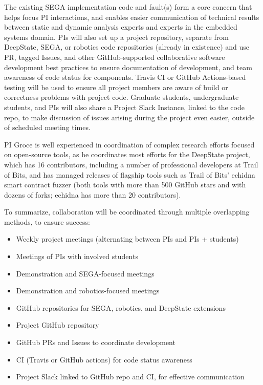 \documentclass{article}
\begin{document}
The existing SEGA implementation code and fault(s) form a core concern that helps focus PI interactions, and enables easier communication of technical results between static and dynamic analysis experts and experts in the embedded systems domain.  PIs will also set up a project repository, separate from DeepState, SEGA, or robotics code repositories (already in existence) and use PR, tagged Issues, and other GitHub-supported collaborative software development best practices to ensure documentation of development, and team awareness of code status for components.  Travis CI or GitHub Actions-based testing will be used to ensure all project members are aware of build or correctness problems with project code.  Graduate students, undergraduate students, and PIs will also share a Project Slack Instance, linked to the code repo, to make discussion of issues arising during the project even easier, outside of scheduled meeting times.

PI Groce is well experienced in coordination of complex research efforts focused on open-source tools, as he coordinates most efforts for the DeepState project, which has 16 contributors, including a number of professional developers at Trail of Bits, and has managed releases of flagship tools such as Trail of Bits' echidna smart contract fuzzer (both tools with more than 500 GitHub stars and with dozens of forks; echidna has more than 20 contributors).

To summarize, collaboration will be coordinated through multiple overlapping methods, to ensure success:
\begin{itemize}
\item Weekly project meetings (alternating between PIs and PIs + students)
\item Meetings of PIs with involved students
\item Demonstration and SEGA-focused meetings
\item Demonstration and robotics-focused meetings
\item GitHub repositories for SEGA, robotics, and DeepState extensions
\item Project GitHub repository
\item GitHub PRs and Issues to coordinate development
\item CI (Travis or GitHub actions) for code status awareness
\item Project Slack linked to GitHub repo and CI, for effective communication
\end{itemize}
\end{document}
